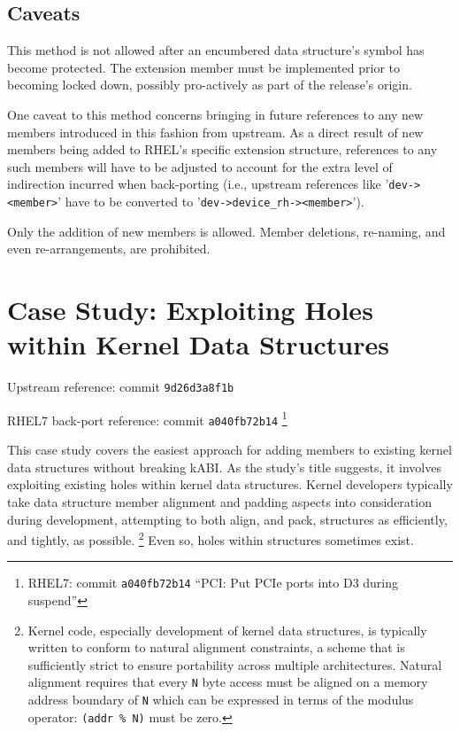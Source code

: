 \documentclass[10pt,oneside,english]{book}
\begin{document}
\subsection{Caveats}

This method is not allowed after an encumbered data structure's symbol
has become protected. The extension member must be implemented prior
to becoming locked down, possibly pro-actively as part of the release's
origin.

One caveat to this method concerns bringing in future references to
any new members introduced in this fashion from upstream. As a direct
result of new members being added to RHEL's specific extension structure,
references to any such members will have to be adjusted to account
for the extra level of indirection incurred when back-porting (i.e.,
upstream references like '\texttt{dev-><member>}' have to be converted
to '\texttt{dev->device\_rh-><member>}').

Only the addition of new members is allowed. Member deletions, re-naming,
and even re-arrangements, are prohibited.

\section{Case Study: Exploiting Holes within Kernel Data Structures \label{sec:Case-Study:Exploting-Holes}}

Upstream reference: commit \texttt{9d26d3a8f1b}

RHEL7 back-port reference: commit \texttt{a040fb72b14} \footnote{RHEL7: commit \texttt{a040fb72b14} ``PCI: Put PCIe ports into D3
during suspend”}

This case study covers the easiest approach for adding members to
existing kernel data structures without breaking kABI. As the study's
title suggests, it involves exploiting existing holes within kernel
data structures. Kernel developers typically take data structure member
alignment and padding aspects into consideration during development,
attempting to both align, and pack, structures as efficiently, and
tightly, as possible. \footnote{Kernel code, especially development of kernel data structures, is
typically written to conform to natural alignment constraints, a scheme
that is sufficiently strict to ensure portability across multiple
architectures. Natural alignment requires that every \texttt{N} byte
access must be aligned on a memory address boundary of \texttt{N}
which can be expressed in terms of the modulus operator: \texttt{(addr
\% N)} must be zero.} Even so, holes within structures sometimes exist.
\end{document}
